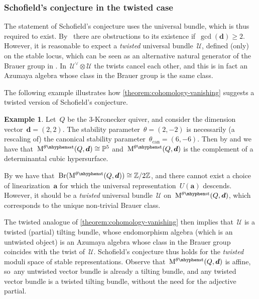 \documentclass[JEP,XML,SOM,Unicode,NoEqCountersInSection,published]{cedram}
\theoremstyle{plain}
\theoremstyle{definition}
\newtheorem{example}[theorem]{Example}
\DeclareMathOperator\Br{Br}
\newcommand\can{\ensuremath{\mathrm{can}}}
\newcommand\moduli{\ensuremath{\mathrm{M}}}
\newcommand\semistable{\ensuremath{\mhyphen\mathrm{sst}}}
\newcommand\stable{\ensuremath{\mhyphen\mathrm{st}}}
\newcommand\tuple[1]{\ensuremath{{\boldsymbol{#1}}}}
\begin{document}
\subsubsection*{Schofield's conjecture in the twisted case}
The statement of Schofield's conjecture uses the universal bundle,
which is thus required to exist. By~\cite[Th.\,4.4]{MR3683503} there are obstructions to its existence
if~$\gcd(\tuple{d})\geq 2$.
However, it is reasonable to expect a \emph{twisted} universal bundle~$\mathcal{U}$,
defined (only) on the stable locus,
which can be seen as an alternative natural generator of the Brauer group in \cite[Conj.\,4.3]{MR3683503}.
In~$\mathcal{U}^\vee\otimes\mathcal{U}$ the twists cancel each other,
and this is in fact an Azumaya algebra whose class in the Brauer group is the same class.

The following example illustrates how \cref{theorem:cohomology-vanishing}
suggests a twisted version of Schofield's conjecture.

\begin{example}
\label{example:twisted-schofield}
Let~$Q$ be the $3$-Kronecker quiver,
and consider the dimension vector~$\tuple{d}=(2,2)$.
The stability parameter~$\theta=(2,-2)$ is necessarily
(a rescaling of) the canonical stability parameter~$\theta_\can=(6,-6)$.
Then by \cite[p.\,1779]{MR1972892}
and \cite[\S7]{MR3683503} we have that~$\moduli^{\theta\semistable}(Q,\tuple{d})\cong\mathbb{P}^5$
and~$\moduli^{\theta\stable}(Q,\tuple{d})$ is the complement of a determinantal cubic hypersurface.

By \cite[Prop.\,7.1]{MR3683503} we have that~$\Br(\moduli^{\theta\stable}(Q,\tuple{d}))\cong\mathbb{Z}/2\mathbb{Z}$,
and there cannot exist a choice of linearization~$\tuple{a}$
for which the universal representation~$U(\tuple{a})$ descends.
However, it should be a \emph{twisted} universal bundle~$\mathcal{U}$ on~$\moduli^{\theta\stable}(Q,\tuple{d})$,
which corresponds to the unique non-trivial Brauer class.

The twisted analogue of \cref{theorem:cohomology-vanishing}
then implies that~$\mathcal{U}$ is a twisted (partial) tilting bundle,
whose endomorphism algebra (which is an untwisted object)
is an Azumaya algebra whose class in the Brauer group coincides with the twist of~$\mathcal{U}$.
Schofield's conjecture thus holds for the \emph{twisted} moduli space of stable representations.
Observe that~$\moduli^{\theta\stable}(Q,\tuple{d})$ is affine, so~any untwisted vector bundle is already a tilting bundle,
and any twisted vector bundle is a twisted tilting bundle,
without the need for the adjective partial.
\end{example}
\end{document}
